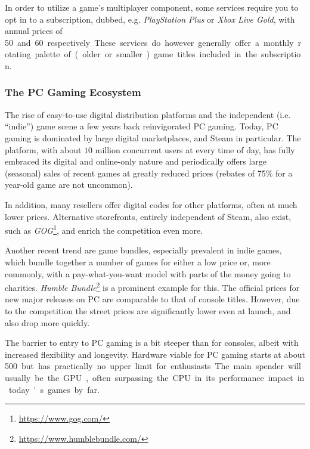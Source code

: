 In order to utilize a game's multiplayer component, some services require you to opt in to a subscription, dubbed, e.g. \textit{PlayStation Plus} or \textit{Xbox Live Gold}, with annual prices of \SI{50}[\EUR] and \SI{60}[\EUR] respectively. These services do however generally offer a monthly rotating palette of (older or smaller) game titles included in the subscription.



\subsubsection{The PC Gaming Ecosystem}

The rise of easy-to-use digital distribution platforms and the independent (i.e. ``indie'') game scene a few years back reinvigorated PC gaming. Today, PC gaming is dominated by large digital marketplaces, and Steam in particular. The platform, with about $10$ million concurrent users at every time of day, has fully embraced its digital and online-only nature and periodically offers large (seasonal) sales of recent games at greatly reduced prices (rebates of 75\% for a year-old game are not uncommon). 

In addition, many resellers offer digital codes for other platforms, often at much lower prices. Alternative storefronts, entirely independent of Steam, also exist, such as \textit{GOG}\footnote{\url{https://www.gog.com/}}, and enrich the competition even more.

Another recent trend are game bundles, especially prevalent in indie games, which bundle together a number of games for either a low price or, more commonly, with a pay-what-you-want model with parts of the money going to charities. \textit{Humble Bundle}\footnote{\url{https://www.humblebundle.com/}} is a prominent example for this. The official prices for new major releases on PC are comparable to that of console titles. However, due to the competition the street prices are significantly lower even at launch, and also drop more quickly.

The barrier to entry to PC gaming is a bit steeper than for consoles, albeit with increased flexibility and longevity. Hardware viable for PC gaming starts at about \SI{500}[\EUR] but has practically no upper limit for enthusiasts. The main spender will usually be the \gls{GPU}, often surpassing the \acrshort{CPU} in its performance impact in today's games by far.

